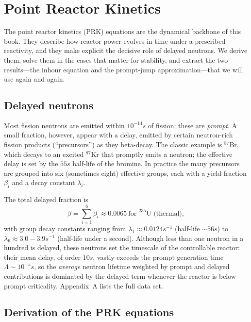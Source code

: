 \chapter{Point Reactor Kinetics}
\label{ch:pk}

The point reactor kinetics (PRK) equations are the dynamical backbone of this
book. They describe how reactor power evolves in time under a prescribed
reactivity, and they make explicit the decisive role of delayed neutrons. We
derive them, solve them in the cases that matter for stability, and extract the
two results---the inhour equation and the prompt-jump approximation---that we
will use again and again.

\section{Delayed neutrons}

Most fission neutrons are emitted within $10^{-14}\unit{s}$ of fission: these are
\emph{prompt}. A small fraction, however, appear with a delay, emitted by certain
neutron-rich fission products (``precursors'') as they beta-decay. The classic
example is $^{87}$Br, which decays to an excited $^{87}$Kr that promptly emits a
neutron; the effective delay is set by the $55\unit{s}$ half-life of the bromine.
In practice the many precursors are grouped into six (sometimes eight) effective
groups, each with a yield fraction $\beta_i$ and a decay constant $\lambda_i$.

The total delayed fraction is
\begin{equation}
\beta = \sum_{i=1}^{6}\beta_i \approx 0.0065 \ \text{for }^{235}\text{U (thermal)},
\end{equation}
with group decay constants ranging from $\lambda_1\approx0.0124\unit{s^{-1}}$
(half-life $\sim 56\unit{s}$) to $\lambda_6\approx 3.0\!-\!3.9\unit{s^{-1}}$
(half-life under a second). Although less than one neutron in a hundred is
delayed, these neutrons set the timescale of the controllable reactor: their
mean delay, of order $10\unit{s}$, vastly exceeds the prompt generation time
$\Lambda\sim 10^{-5}\unit{s}$, so the \emph{average} neutron lifetime weighted by
prompt and delayed contributions is dominated by the delayed term whenever the
reactor is below prompt criticality. Appendix~A lists the full data set.

\section{Derivation of the PRK equations}

